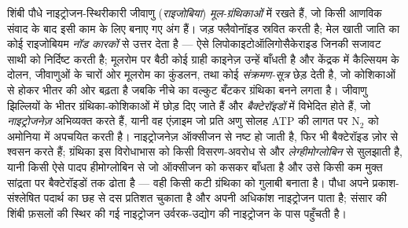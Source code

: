 \begin{definition}[शिंबी--राइजोबियम सहजीविता]\label{def:b3:microbiomes:nodule}
शिंबी पौधे नाइट्रोजन-स्थिरीकारी जीवाणु (\emph{राइजोबिया})
\emph{मूल-ग्रंथिकाओं} में रखते हैं, जो किसी आणविक संवाद के बाद इसी काम
के लिए बनाए गए अंग हैं। जड़ फ्लैवोनॉइड स्रवित करती है; मेल खाती जाति का
कोई राइजोबियम \emph{नॉड कारकों} से उत्तर देता है --- ऐसे
लिपोकाइटोऑलिगोसैकेराइड जिनकी सजावट साथी को निर्दिष्ट करती है; मूलरोम पर
बैठी कोई ग्राही काइनेज़ उन्हें बाँधती है और केंद्रक में कैल्सियम के
दोलन, जीवाणुओं के चारों ओर मूलरोम का कुंडलन, तथा कोई
\emph{संक्रमण-सूत्र} छेड़ देती है, जो कोशिकाओं से होकर भीतर की ओर बढ़ता
है जबकि नीचे का वल्कुट बँटकर ग्रंथिका बनने लगता है। जीवाणु झिल्लियों के
भीतर ग्रंथिका-कोशिकाओं में छोड़ दिए जाते हैं और \emph{बैक्टेरॉइडों} में
विभेदित होते हैं, जो \emph{नाइट्रोजनेज़} अभिव्यक्त करते हैं, यानी वह
एंज़ाइम जो प्रति अणु सोलह ATP की लागत पर N$_{2}$ को अमोनिया में अपचयित
करती है। नाइट्रोजनेज़ ऑक्सीजन से नष्ट हो जाती है, फिर भी बैक्टेरॉइड
ज़ोर से श्वसन करते हैं; ग्रंथिका इस विरोधाभास को किसी विसरण-अवरोध से और
\emph{लेग्हीमोग्लोबिन} से सुलझाती है, यानी किसी ऐसे पादप हीमोग्लोबिन से
जो ऑक्सीजन को कसकर बाँधता है और उसे किसी कम मुक्त सांद्रता पर
बैक्टेरॉइडों तक ढोता है --- वही किसी कटी ग्रंथिका को गुलाबी बनाता है।
पौधा अपने प्रकाश-संश्लेषित पदार्थ का छह से दस प्रतिशत चुकाता है और अपनी
अधिकांश नाइट्रोजन पाता है; संसार की शिंबी फ़सलों की स्थिर की गई
नाइट्रोजन उर्वरक-उद्योग की नाइट्रोजन के पास पहुँचती है।
\end{definition}

